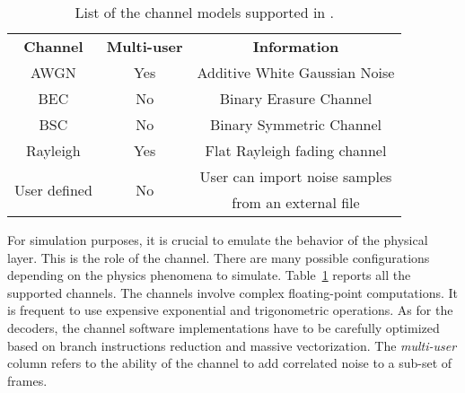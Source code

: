 \begin{table}[htp]
  \centering
  \caption{List of the channel models supported in \AFFECT.}
  \label{tab:aff3ct_features_channels}
  \begin{tabular}{ c | c | c }
  \multirow{2}{*}{\textbf{Channel}}      & \multirow{2}{*}{\textbf{Multi-user}} & \multirow{2}{*}{\textbf{Information}}          \\
                                         &                                      &                                                \\
  \hline
  \hline
  \multirow{2}{*}{{AWGN}}                & \multirow{2}{*}{Yes}                 & \multirow{2}{*}{Additive White Gaussian Noise} \\
                                         &                                      &                                                \\
  \hline
  \multirow{2}{*}{{BEC}}                 & \multirow{2}{*}{No}                  & \multirow{2}{*}{Binary Erasure Channel}        \\
                                         &                                      &                                                \\
  \hline
  \multirow{2}{*}{{BSC}}                 & \multirow{2}{*}{No}                  & \multirow{2}{*}{Binary Symmetric Channel}      \\
                                         &                                      &                                                \\
  \hline
  \multirow{2}{*}{{Rayleigh}}            & \multirow{2}{*}{Yes}                 & \multirow{2}{*}{Flat Rayleigh fading channel}  \\
                                         &                                      &                                                \\
  \hline
  \multirow{2}{*}{{User defined}}        & \multirow{2}{*}{No}                  & User can import noise samples                  \\
                                         &                                      & from an external file                          \\
  \end{tabular}
\end{table}

For simulation purposes, it is crucial to emulate the behavior of the physical
layer. This is the role of the channel. There are many possible configurations
depending on the physics phenomena to simulate.
Table~\ref{tab:aff3ct_features_channels} reports all the supported channels. The
channels involve complex floating-point computations. It is frequent to use
expensive exponential and trigonometric operations. As for the decoders, the
channel software implementations have to be carefully optimized based on branch
instructions reduction and massive vectorization. The \emph{multi-user} column
refers to the ability of the channel to add correlated noise to a sub-set of
frames.

